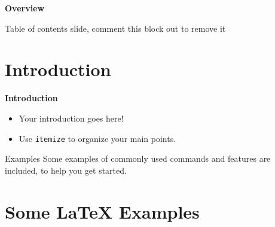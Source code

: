 \documentclass[aspectratio=169]{beamer}
\begin{document}


\begin{frame}{\textbf{Overview}}\vspace{3.5mm}

Table of contents slide, comment this block out to remove it
\tableofcontents %
\end{frame}

\section{Introduction}
\begin{frame}{\textbf{Introduction}}\vspace{3.5mm}

\begin{itemize}
  \item Your introduction goes here!
  \item Use \texttt{itemize} to organize your main points.
\end{itemize}

\vskip 1cm

\begin{block}{Examples}
Some examples of commonly used commands and features are included, to help you get started.
\end{block}

\end{frame}
\section{Some \LaTeX{} Examples}
\end{document}
